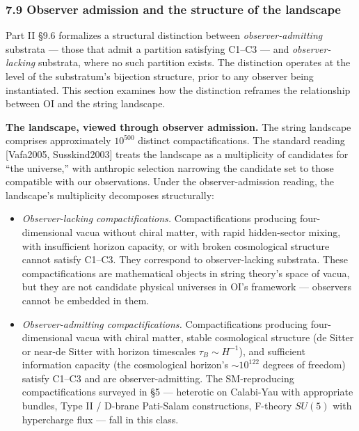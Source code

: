 \documentclass[
]{article}
\begin{document}
\hypertarget{observer-admission-and-the-structure-of-the-landscape}{%
\subsubsection{7.9 Observer admission and the structure of the
landscape}\label{observer-admission-and-the-structure-of-the-landscape}}

Part II §9.6 formalizes a structural distinction between
\emph{observer-admitting} substrata --- those that admit a partition
satisfying C1--C3 --- and \emph{observer-lacking} substrata, where no
such partition exists. The distinction operates at the level of the
substratum's bijection structure, prior to any observer being
instantiated. This section examines how the distinction reframes the
relationship between OI and the string landscape.

\textbf{The landscape, viewed through observer admission.} The string
landscape comprises approximately \(10^{500}\) distinct
compactifications. The standard reading {[}Vafa2005, Susskind2003{]}
treats the landscape as a multiplicity of candidates for ``the
universe,'' with anthropic selection narrowing the candidate set to
those compatible with our observations. Under the observer-admission
reading, the landscape's multiplicity decomposes structurally:

\begin{itemize}
\item
  \emph{Observer-lacking compactifications.} Compactifications producing
  four-dimensional vacua without chiral matter, with rapid hidden-sector
  mixing, with insufficient horizon capacity, or with broken
  cosmological structure cannot satisfy C1--C3. They correspond to
  observer-lacking substrata. These compactifications are mathematical
  objects in string theory's space of vacua, but they are not candidate
  physical universes in OI's framework --- observers cannot be embedded
  in them.
\item
  \emph{Observer-admitting compactifications.} Compactifications
  producing four-dimensional vacua with chiral matter, stable
  cosmological structure (de Sitter or near-de Sitter with horizon
  timescales \(\tau_B \sim H^{-1}\)), and sufficient information
  capacity (the cosmological horizon's \(\sim 10^{122}\) degrees of
  freedom) satisfy C1--C3 and are observer-admitting. The SM-reproducing
  compactifications surveyed in §5 --- heterotic on Calabi-Yau with
  appropriate bundles, Type II / D-brane Pati-Salam constructions,
  F-theory \(SU(5)\) with hypercharge flux --- fall in this class.
\end{itemize}
\end{document}
